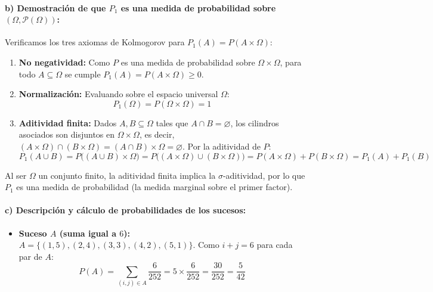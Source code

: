 \begin{problema}
\paragraph{b) Demostración de que $P_1$ es una medida de probabilidad sobre $(\Omega, \mathcal{P}(\Omega))$:}
Verificamos los tres axiomas de Kolmogorov para $P_1(A) = P(A \times \Omega)$:
\begin{enumerate}[label=\arabic*.]
    \item \textbf{No negatividad:} Como $P$ es una medida de probabilidad sobre $\Omega \times \Omega$, para todo $A \subseteq \Omega$ se cumple $P_1(A) = P(A \times \Omega) \ge 0$.
    \item \textbf{Normalización:} Evaluando sobre el espacio universal $\Omega$:
    \[P_1(\Omega) = P(\Omega \times \Omega) = 1\]
    \item \textbf{Aditividad finita:} Dados $A, B \subseteq \Omega$ tales que $A \cap B = \varnothing$, los cilindros asociados son disjuntos en $\Omega \times \Omega$, es decir, $(A \times \Omega) \cap (B \times \Omega) = (A \cap B) \times \Omega = \varnothing$. Por la aditividad de $P$:
    \[P_1(A \cup B) = P\bigl((A \cup B) \times \Omega\bigr) = P\bigl((A \times \Omega) \cup (B \times \Omega)\bigr) = P(A \times \Omega) + P(B \times \Omega) = P_1(A) + P_1(B)\]
\end{enumerate}
Al ser $\Omega$ un conjunto finito, la aditividad finita implica la $\sigma$-aditividad, por lo que $P_1$ es una medida de probabilidad (la medida marginal sobre el primer factor).

\begin{center}
    \vspace{0.2cm}
    \vspace{0.2cm}
\end{center}

\paragraph{c) Descripción y cálculo de probabilidades de los sucesos:}
\begin{itemize}
    \item \textbf{Suceso $A$ (suma igual a $6$):}
    $A = \{(1,5), (2,4), (3,3), (4,2), (5,1)\}$. Como $i+j = 6$ para cada par de $A$:
    \[P(A) = \sum_{(i,j) \in A} \frac{6}{252} = 5 \times \frac{6}{252} = \frac{30}{252} = \frac{5}{42}\]


\end{itemize}
\end{problema}
